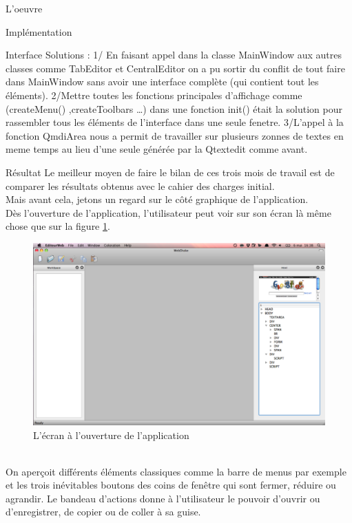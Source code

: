 \documentclass[a4paper, 12pt]{report}
\begin{document}
\begin{part}{L'oeuvre}
\begin{chapter}{Implémentation}
\begin{section}{Interface}
Solutions :
1/ En faisant appel dans la classe MainWindow aux autres classes comme TabEditor et
CentralEditor on a pu sortir du conflit de tout faire dans MainWindow sans avoir une
interface complète (qui contient tout les éléments).
2/Mettre toutes les fonctions principales d'affichage comme (createMenu() ,createToolbars …)
dans une fonction init() était la solution pour rassembler tous les éléments de l'interface dans
une seule fenetre.
3/L'appel à la fonction QmdiArea nous a permit de travailler sur plusieurs zonnes de textes en
meme temps au lieu d'une seule générée par la Qtextedit comme avant.

			\end{section}
		\end{chapter}
		\begin{chapter}{Résultat}
			Le meilleur moyen de faire le bilan de ces trois mois de travail est de comparer les résultats obtenus avec le cahier des charges initial.\\
			Mais avant cela, jetons un regard sur le côté graphique de l'application.\\

			Dès l'ouverture de l'application, l'utilisateur peut voir sur son écran là même chose que sur la figure \ref{mayonnaise}.

			\begin{figure}[h]
				\begin{center}
					\includegraphics[width=15cm]{images/screenOpening.png}
					\caption{L'écran à l'ouverture de l'application}
					\label{mayonnaise}
				\end{center}
			\end{figure}~\\


			On aperçoit différents éléments classiques comme la barre de menus par exemple et les trois inévitables boutons des coins de fenêtre qui sont fermer, réduire ou agrandir. Le bandeau d'actions donne à l'utilisateur le pouvoir d'ouvrir ou d'enregistrer, de copier ou de coller
			à sa guise.\\



\end{chapter}
\end{part}
\end{document}
